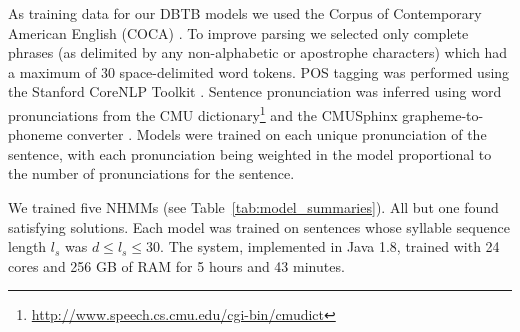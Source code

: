 \documentclass[phd,electronic,oneside,twosidetoc,letterpaper,chaptercenter,parttop,lol,lof,lot]{byumsphd}
\begin{document}




As training data for our DBTB models we used the Corpus of Contemporary American English (COCA) \cite{davies2009385+}. To improve parsing we selected only complete phrases (as delimited by any non-alphabetic or apostrophe characters) which had a maximum of 30 space-delimited word tokens. POS tagging was performed using the Stanford CoreNLP Toolkit \cite{Manning2014}. Sentence pronunciation was inferred using word pronunciations from the CMU dictionary\footnote{\url{http://www.speech.cs.cmu.edu/cgi-bin/cmudict}} and the CMUSphinx grapheme-to-phoneme converter \cite{Walker2004}. Models were trained on each unique pronunciation of the sentence, with each pronunciation being weighted in the model proportional to the number of pronunciations for the sentence.

We trained five NHMMs (see Table~\ref{tab:model_summaries}). All but one found satisfying solutions. Each model was trained on sentences whose syllable sequence length $l_s$ was $d \leq l_s \leq 30$. The system, implemented in Java 1.8, trained with 24 cores and 256 GB of RAM for 5 hours and 43 minutes.
\end{document}
